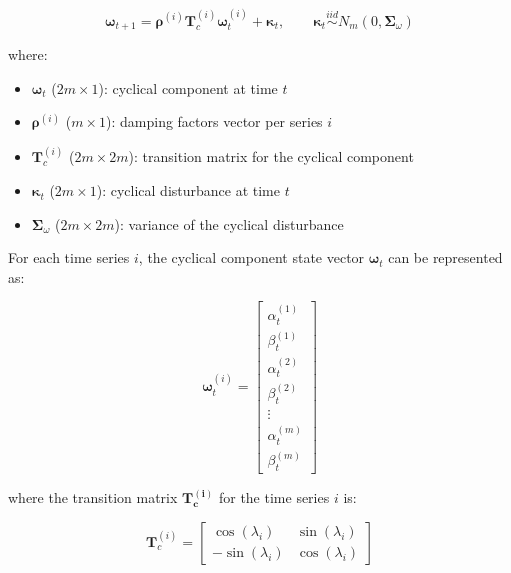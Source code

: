     \begin{equation}
        \bm{\omega}_{t+1} = \bm{\rho}^{(i)} \bm{T}_c^{(i)} \bm{\omega}_{t}^{(i)} + \bm{\kappa}_{t},
            \qquad \bm{\kappa}_{t} \stackrel{\textit{iid}}{\sim} N_{m}(0, \bm{\Sigma}_{\omega})
        \label{eq:cyclical_state}
    \end{equation}

    where:
    \begin{itemize}
        \item $\bm{\omega}_{t}$ ($2m \times 1$): cyclical component at time $t$
        \item $\bm{\rho}^{(i)}$ ($m \times 1$): damping factors vector per series $i$
        \item $\bm{T}_c^{(i)}$ ($2m \times 2m$): transition matrix for the cyclical component
        \item $\bm{\kappa}_{t}$ ($2m \times 1$): cyclical disturbance at time $t$
        \item $\bm{\Sigma}_{\omega}$ ($2m \times 2m$): variance of the cyclical disturbance
    \end{itemize}

    For each time series $i$, the cyclical component state vector $\bm{\omega}_{t}$ can be represented as:

    \begin{equation}
        \bm{\omega}_{t}^{(i)}=
            \left[
                \begin{array}{c}
                    \alpha_{t}^{(1)} \\
                    \beta_{t}^{(1)} \\
                    \alpha_{t}^{(2)} \\
                    \beta_{t}^{(2)} \\
                    \vdots \\
                    \alpha_{t}^{(m)} \\
                    \beta_{t}^{(m)}
                \end{array}
            \right]
        \label{eq:cyclical_state_vector}
    \end{equation}

    where the transition matrix $\bm{T_c^{(i)}}$ for the time series $i$ is:

    \begin{equation}
        \bm{T}_c^{(i)}=
            \left[
                \begin{array}{cc}
                    \cos \left(\lambda_i\right) & \sin \left(\lambda_i\right) \\
                    -\sin \left(\lambda_i\right) & \cos \left(\lambda_i\right)
                \end{array}
            \right]
        \label{eq:cyclical_transition_matrix}
    \end{equation}

